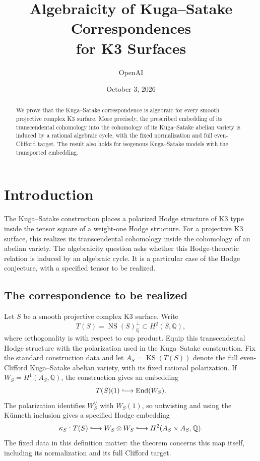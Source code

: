 \documentclass[11pt]{article}
\title{Algebraicity of Kuga--Satake Correspondences\\for K3 Surfaces}
\author{OpenAI}
\date{October 3, 2026}
\numberwithin{equation}{section}
\theoremstyle{definition}
\theoremstyle{remark}
\newcommand{\Q}{\mathbb Q}
\newcommand{\NS}{\operatorname{NS}}
\newcommand{\End}{\operatorname{End}}
\newcommand{\KS}{\operatorname{KS}}
\begin{document}
\maketitle
\begin{abstract}
We prove that the Kuga--Satake correspondence is algebraic for every smooth projective complex K3 surface. More precisely, the prescribed embedding of its transcendental cohomology into the cohomology of its Kuga--Satake abelian variety is induced by a rational algebraic cycle, with the fixed normalization and full even-Clifford target. The result also holds for isogenous Kuga--Satake models with the transported embedding.
\end{abstract}
\tableofcontents

\section{Introduction}
\label{sec:introduction}

The Kuga--Satake construction places a polarized Hodge structure of
K3 type inside the tensor square of a weight-one Hodge structure.
For a projective K3 surface, this realizes its transcendental
cohomology inside the cohomology of an abelian variety.  The
algebraicity question asks whether this Hodge-theoretic relation is
induced by an algebraic cycle.  It is a particular case of the Hodge
conjecture, with a specified tensor to be realized.

\subsection{The correspondence to be realized}

Let $S$ be a smooth projective complex K3 surface.  Write
\[
 T(S)=\NS(S)_\Q^{\perp}\subset H^2(S,\Q),
\]
where orthogonality is with respect to cup product.  Equip this
transcendental Hodge structure with the polarization used in the
Kuga--Satake construction.  Fix the standard construction data and
let $A_S=\KS(T(S))$ denote the full even-Clifford Kuga--Satake
abelian variety, with its fixed rational polarization.  If
$W_S=H^1(A_S,\Q)$, the construction gives an embedding
\[
             T(S)(1)\lhook\joinrel\longrightarrow\End(W_S).
\]
The polarization identifies $W_S^\vee$ with $W_S(1)$, so untwisting
and using the K\"unneth inclusion gives a specified Hodge embedding
\begin{equation}
 \kappa_S:T(S)\lhook\joinrel\longrightarrow
       W_S\otimes W_S\lhook\joinrel\longrightarrow
       H^2(A_S\times A_S,\Q).
 \label{eq:prescribed-ks-map}
\end{equation}
The fixed data in this definition matter: the theorem concerns this
map itself, including its normalization and its full Clifford target.
\end{document}
